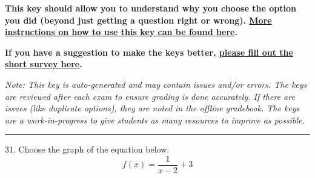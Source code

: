 \documentclass{extbook}[14pt]
\begin{document}
\textbf{This key should allow you to understand why you choose the option you did (beyond just getting a question right or wrong). \href{https://xronos.clas.ufl.edu/mac1105spring2020/courseDescriptionAndMisc/Exams/LearningFromResults}{More instructions on how to use this key can be found here}.}

\textbf{If you have a suggestion to make the keys better, \href{https://forms.gle/CZkbZmPbC9XALEE88}{please fill out the short survey here}.}

\textit{Note: This key is auto-generated and may contain issues and/or errors. The keys are reviewed after each exam to ensure grading is done accurately. If there are issues (like duplicate options), they are noted in the offline gradebook. The keys are a work-in-progress to give students as many resources to improve as possible.}

\rule{\textwidth}{0.4pt}

31. Choose the graph of the equation below.
\[ f(x) = \frac{1}{x - 2} + 3 \] 
\end{document}
